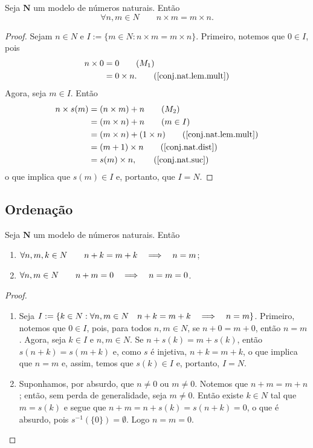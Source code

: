 \begin{teo}
	Seja $\bm N$ um modelo de números naturais. Então
	\begin{equation*}
	\forall n,m \in N \qquad n \times m = m \times n.
	\end{equation*}
\end{teo}
\begin{proof}
	Sejam $n \in N$ e $I := \{m \in N:n \times m=m \times n\}$. Primeiro, notemos que $0 \in I$, pois
	\begin{align*}
	n \times 0 &= 0 													\tag{$M_1$} \\
		&= 0 \times n.													\tag{\ref{conj.nat.lem.mult}}
	\end{align*}
Agora, seja $m \in I$. Então
	\begin{align*}
	n \times s(m) &= (n \times m) + n							\tag{$M_2$} \\
		&= (m \times n) + n											\tag{$m \in I$} \\
		&= (m \times n) + (1 \times n)							\tag{\ref{conj.nat.lem.mult}} \\
		&= (m +1) \times n											\tag{\ref{conj.nat.dist}} \\
		&= s(m) \times n,												\tag{\ref{conj.nat.suc}}
	\end{align*}
o que implica que $s(m) \in I$ e, portanto, que $I=N$.
\end{proof}

\subsection{Ordenação}

\begin{lema}
	Seja $\bm N$ um modelo de números naturais. Então
	\begin{enumerate}
	\item $\forall n,m,k \in N \qquad n+k=m+k \quad \Longrightarrow \quad n=m$;
	\item $\forall n,m \in N \qquad n+m = 0 \quad \Longrightarrow \quad n=m=0$.
	\end{enumerate}
\end{lema}
\begin{proof}
	\begin{enumerate}
	\item Seja $I := \{k \in N: \forall n,m \in N \quad n+k=m+k \quad \Longrightarrow \quad n=m\}$. Primeiro, notemos que $0 \in I$, pois, para todos $n,m \in N$, se $n+0=m+0$, então $n=m$. Agora, seja $k \in I$ e $n,m \in N$. Se $n+s(k)=m+s(k)$, então $s(n+k)=s(m+k)$ e, como $s$ é injetiva, $n+k=m+k$, o que implica que $n=m$ e, assim, temos que $s(k) \in I$ e, portanto, $I=N$.
	
	\item Suponhamos, por absurdo, que $n \neq 0$ ou $m \neq 0$. Notemos que $n+m=m+n$; então, sem perda de generalidade, seja $m \neq 0$. Então existe $k \in N$ tal que $m=s(k)$ e segue que $n+m=n+s(k)=s(n+k)=0$, o que é absurdo, pois $s^{-1}(\{0\})=\emptyset$. Logo $n=m=0$.
	\end{enumerate}
\end{proof}


